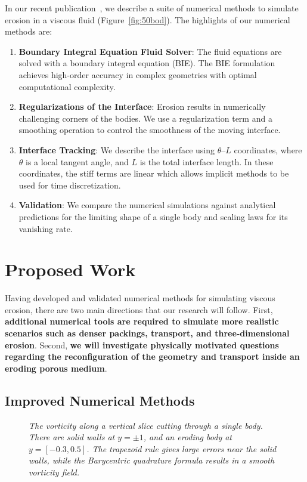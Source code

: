 \documentclass[11pt]{article}
\newcommand{\thL}{$\theta$--$L$}
\begin{document}
In our recent publication~\cite{qua-moo2018}, we describe a suite of
numerical methods to simulate erosion in a viscous fluid
(Figure~\ref{fig:50bod}).  The highlights of our numerical methods are:
\begin{enumerate}[topsep=0pt,itemsep=-1ex,partopsep=1ex,parsep=1ex]
  \item {\bf Boundary Integral Equation Fluid Solver}: The
  fluid equations are solved with a boundary integral equation (BIE).
  The BIE formulation achieves high-order accuracy in complex geometries
  with optimal computational complexity.

  \item {\bf Regularizations of the Interface}: Erosion results in
  numerically challenging corners of the bodies.  We use a
  regularization term and a smoothing operation to control the
  smoothness of the moving interface.

  \item {\bf Interface Tracking}: We describe the interface using
  {\thL} coordinates, where $\theta$ is a local tangent angle, and $L$
  is the total interface length.  In these coordinates, the
  stiff terms are linear which allows implicit methods to be used for time discretization.

  \item {\bf Validation}: We compare the numerical simulations against analytical predictions for the limiting shape of a single body and scaling laws for its vanishing rate.
\end{enumerate}

\section{Proposed Work}
Having developed and validated numerical methods for simulating viscous
erosion, there are two main directions that our research will follow.
First, {\bf additional numerical tools are required to simulate more
realistic scenarios such as denser packings, transport, and
three-dimensional erosion}.  Second, {\bf we will investigate physically
motivated questions regarding the reconfiguration of the geometry and
transport inside an eroding porous medium}.

\subsection{Improved Numerical Methods}
\begin{figure}
\centering

\caption{\label{fig:vort1} \em The vorticity along a vertical slice
cutting through a single body.  There are solid walls at $y = \pm 1$,
and an eroding body at $y = [-0.3,0.5]$.  The trapezoid rule gives large
errors near the solid walls, while the Barycentric quadrature formula
results in a smooth vorticity field.}
\end{figure}
\end{document}
